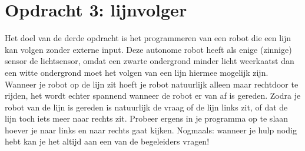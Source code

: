 \documentclass[11pt]{article} %
\begin{document}
\section*{Opdracht 3: lijnvolger}
Het doel van de derde opdracht is het programmeren van een robot die een lijn kan volgen zonder externe input.
Deze autonome robot heeft als enige (zinnige) sensor de lichtsensor, omdat een zwarte ondergrond minder licht weerkaatst dan een witte ondergrond moet het volgen van een lijn hiermee mogelijk zijn. 
Wanneer je robot op de lijn zit hoeft je robot natuurlijk alleen maar rechtdoor te rijden, het wordt echter spannend wanneer de robot er van af is gereden. 
Zodra je robot van de lijn is gereden is natuurlijk de vraag of de lijn links zit, of dat de lijn toch iets meer naar rechts zit. 
Probeer ergens in je programma op te slaan hoever je naar links en naar rechts gaat kijken.
Nogmaals: wanneer je hulp nodig hebt kan je het altijd aan een van de begeleiders vragen!
\end{document}
